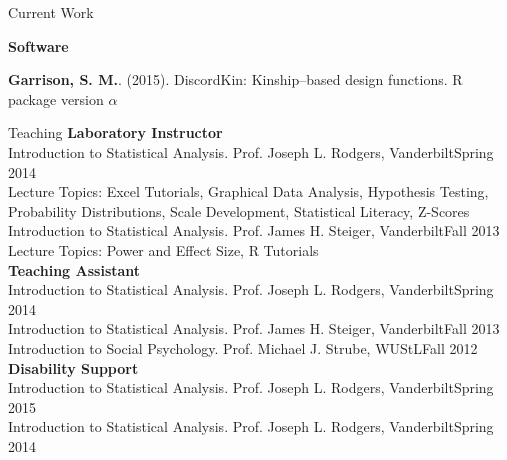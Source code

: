 \documentclass {resume}
\newcommand{\R}{\textup{\textrm{R}}\xspace}
\newcommand{\meb}{{\bf Garrison, S. M.}\xspace}
\newcommand{\et}{\textit{et al}.\xspace}
\newlength{\wideitemsep}
\let\olditem\item
\renewcommand{\item}{\setlength{\itemsep}{\wideitemsep}\olditem}
\begin{document}
\begin{rSection}{\textrm{Current Work}}
\begin{etaremune}
\end{etaremune}{\large {\bf Software}}\begin{etaremune}
\item \meb. (2015). DiscordKin: Kinship--based design functions. \R package version $\alpha$%
\end{etaremune}\end{rSection}


\begin{rSection}{\textrm{Teaching
}}
{\large {\bf Laboratory Instructor}\\}
Introduction to Statistical Analysis. Prof. Joseph L. Rodgers, Vanderbilt\hfill  {Spring 2014}\\
\hspace* {6 mm}Lecture Topics: Excel Tutorials, Graphical Data Analysis, Hypothesis Testing,\\
\hspace* {6 mm}Probability Distributions, Scale Development, Statistical Literacy, Z-Scores%
\smallskip\\
Introduction to Statistical Analysis. Prof. James H. Steiger, Vanderbilt\hfill  {Fall 2013}\\
\hspace* {6 mm}Lecture Topics: Power and Effect Size, R Tutorials\medskip\\
{\large {\bf Teaching Assistant}}\\
Introduction to Statistical Analysis. Prof. Joseph L. Rodgers, Vanderbilt\hfill  {Spring 2014}\smallskip\\
Introduction to Statistical Analysis. Prof. James H. Steiger, Vanderbilt\hfill  {Fall 2013}\smallskip\\
Introduction to Social Psychology. Prof. Michael J. Strube, WUStL\hfill  {Fall 2012}%
\medskip\\
{\large {\bf Disability Support}}\\
Introduction to Statistical Analysis. Prof. Joseph L. Rodgers, Vanderbilt\hfill  {Spring 2015}\smallskip\\
Introduction to Statistical Analysis. Prof. Joseph L. Rodgers, Vanderbilt\hfill  {Spring 2014}
\end{rSection}%
\end{document}
